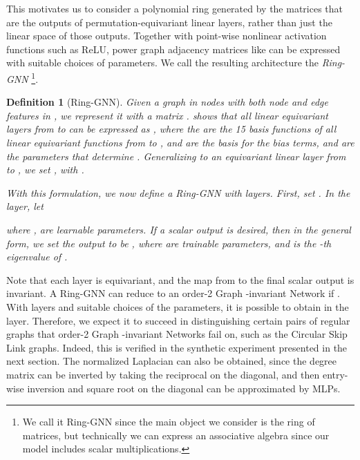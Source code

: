 \documentclass{article}
\newtheorem{definition}{Definition}
\begin{document}
This motivates us to consider a polynomial ring generated by the matrices that are the outputs of permutation-equivariant linear layers, rather than just the linear space of those outputs. Together with point-wise nonlinear activation functions such as ReLU, power graph adjacency matrices like  can be expressed with suitable choices of parameters. We call the resulting architecture the \textit{Ring-GNN}  \footnote{We call it Ring-GNN since the main object we consider is the ring of matrices, but technically we can express an associative algebra since our model includes scalar multiplications.}.


\begin{definition}[Ring-GNN] Given a graph in  nodes with both node and edge features in , we represent it with a matrix .
\cite{maron2018invariant}
shows that all linear equivariant layers from  to  can be expressed as , where the  are the 15 basis functions
of all linear equivariant functions from  to ,  and  are the basis for the bias terms, and  are the parameters that determine . Generalizing to an equivariant linear layer from  to , we set , with .


With this formulation, we now define a Ring-GNN with  layers. First, set . In the  layer, let

where ,  are learnable parameters. If a scalar output is desired, then in the general form, we set the output to be , where  are trainable parameters, and   is the -th eigenvalue of .
\end{definition}

Note that each layer is equivariant, and the map from  to the final scalar output is invariant. A Ring-GNN can reduce to an order-2 Graph -invariant Network if . With  layers and suitable choices of the parameters, it is possible to obtain  in the  layer. Therefore, we expect it to succeed in distinguishing certain pairs of regular graphs that order-2 Graph -invariant Networks fail on, such as the Circular Skip Link graphs. Indeed, this is verified in the synthetic experiment presented in the next section. The normalized Laplacian can also be obtained, since the degree matrix can be inverted by taking the reciprocal on the diagonal, and then entry-wise inversion and square root on the diagonal can be approximated by MLPs.
\end{document}
